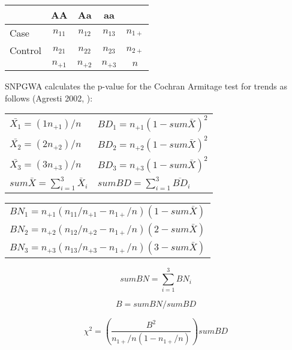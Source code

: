 \begin{enumerate}
\begin{center}
  \begin{tabular}{lcccc}
    \hline
    {} & \textbf{AA} & \textbf{Aa} & \textbf{aa} & {} \\
    \hline
    Case & $n_{11}$ & $n_{12}$ & $n_{13}$ & $n_{1+}$ \\
    Control & $n_{21}$ & $n_{22}$ & $n_{23}$ & $n_{2+}$ \\
    {}   & $n_{+1}$ & $n_{+2}$ & $n_{+3}$  & $n$ \\
    \hline
  \end{tabular}
\end{center}

SNPGWA calculates the p-value for the Cochran Armitage test for trends as
follows (Agresti 2002, \cite{Agresti02}):

\begin{center}
  \begin{tabular}{ll}
    $\bar{X_1} = (1n_{+1})/n$ &  $BD_1 = n_{+1}(1-sum\bar{X})^2$ \\
    $\bar{X_2} = (2n_{+2})/n$ &  $BD_2 = n_{+2}(1-sum\bar{X})^2$ \\
    $\bar{X_3} = (3n_{+3})/n$ &  $BD_3 = n_{+3}(1-sum\bar{X})^2$ \\
    $sum\bar{X} = \sum_{i=1}^3\bar{X}_i$ & $sumBD = \sum_{i=1}^3\overline{BD}_i$ \\
  \end{tabular}
\end{center}
\vspace{1em}

\begin{center}
  \begin{tabular}{c}
    $BN_1 = n_{+1}(n_{11}/n_{+1} -n_{1+}/n)(1-sum\bar{X})$ \\
    $BN_2 = n_{+2}(n_{12}/n_{+2} -n_{1+}/n)(2-sum\bar{X})$ \\
    $BN_3 = n_{+3}(n_{13}/n_{+3} -n_{1+}/n)(3-sum\bar{X})$ \\
  \end{tabular}
\end{center}

\begin{equation*}
  sumBN = \sum_{i=1}^3BN_i
\end{equation*}

\vspace{1em}
\begin{equation*}
  B = sumBN/sumBD
\end{equation*}

\begin{equation*}
  \chi^2 = \left(\frac{B^2}{n_{1+}/n(1-n_{1+}/n)}\right)sumBD
\end{equation*}


\end{enumerate}

